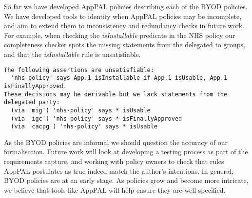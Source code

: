 \documentclass{easychair}
\begin{document}
So far we have developed AppPAL policies describing each of the BYOD policies.
We have developed tools to identify when AppPAL policies may be incomplete, and aim to extend them to inconsistency and redundancy checks in future work.
For example, when checking the \emph{isInstallable} predicate in the NHS policy our completeness checker spots the missing statements from the delegated to groups, and that the \emph{isInstallable} rule is unsatisfiable.
\begin{lstlisting}
The following assertions are unsatisfiable:
  'nhs-policy' says App.1 isInstallable if App.1 isUsable, App.1 isFinallyApproved.
These decisions may be derivable but we lack statements from the delegated party:
  (via 'mig') 'nhs-policy' says * isUsable
  (via 'igc') 'nhs-policy' says * isFinallyApproved
  (via 'cacpg') 'nhs-policy' says * isUsable
\end{lstlisting}
As the BYOD policies are informal we should question the accuracy of our formalisation.
Future work will look at developing a testing process as part of the requirements capture, and working with policy owners to check that rules AppPAL postulates as true indeed match the author's intentions.
In general, BYOD policies are at an early stage.
As policies grow and become more intricate, we believe that tools like AppPAL will help ensure they are well specified.
\end{document}
